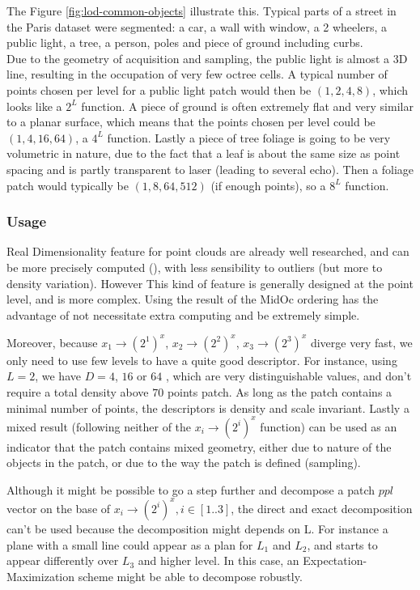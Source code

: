 		
		The Figure \ref{fig:lod-common-objects} illustrate this. Typical parts of a street in the Paris dataset were segmented: a car, a wall with window, a 2 wheelers, a public light, a tree, a person, poles and piece of ground including curbs.
		\\
		Due to the geometry of acquisition and sampling, the public light is almost a 3D line, resulting in the occupation of very few octree cells.
		A typical number of points chosen per level for a public light patch would then be $(1,2,4,8)$, which looks like a $2^L$ function.
		A piece of ground is often extremely flat and very similar to a planar surface,
		which means that the points chosen per level could be $(1,4,16,64)$, a $4^L$ function.
		Lastly a piece of tree foliage is going to be very volumetric in nature,
		due to the fact that a leaf is about the same size as point spacing and is partly transparent to laser (leading to several echo).
		Then a foliage patch would typically be $(1,8,64,512)$ (if enough points), so a $8^L$ function.
		
		\subsubsection{Usage}

		Real Dimensionality feature for point clouds are already well researched, and can be more precisely computed (\cite{Demantke2014}), with less sensibility to outliers (but more to density variation). However This kind of feature is generally designed at the point level, and is more complex.
		Using the result of the MidOc ordering has the advantage of not necessitate extra computing and be extremely simple.
		
		Moreover, because $x_1 \rightarrow (2^1)^x$,
		$x_2 \rightarrow (2^2)^x$, $x_3 \rightarrow (2^3)^x$ diverge very fast,
		we only need to use few levels to have a quite good descriptor.
		For instance, using $L=2$, we have $D=4$, $16$ or $64$ , which are very distinguishable values, and don't require a total density above $70$ points \per patch.  
		As long as the patch contains a minimal number of points, the descriptors is density and scale invariant. 
		Lastly a mixed result (following neither of the $x_i \rightarrow (2^i)^x$ function) can be used as an indicator that the patch contains mixed geometry, either due to nature of the objects in the patch, or due to the way the patch is defined (sampling).
		
		Although it might be possible to go a step further and decompose a patch $ppl$ vector on the base of $x_i \rightarrow (2^i)^x, i \in [1..3]$, the direct and exact decomposition can't be used because the decomposition might depends on L. For instance a plane with a small line could appear as a plan for $L_1$ and $L_2$, and starts to appear differently over $L_3$ and higher level. In this case, an Expectation-Maximization scheme might be able to decompose robustly.
 
